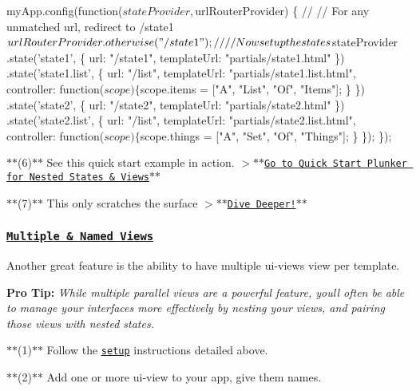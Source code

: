 \begin{quote}


\end{quote}

\begin{DoxyCode}
myApp.config(function($stateProvider, $urlRouterProvider) \{
  //
  // For any unmatched url, redirect to /state1
  $urlRouterProvider.otherwise("/state1");
  //
  // Now set up the states
  $stateProvider
    .state('state1', \{
      url: "/state1",
      templateUrl: "partials/state1.html"
    \})
    .state('state1.list', \{
      url: "/list",
      templateUrl: "partials/state1.list.html",
      controller: function($scope) \{
        $scope.items = ["A", "List", "Of", "Items"];
      \}
    \})
    .state('state2', \{
      url: "/state2",
      templateUrl: "partials/state2.html"
    \})
    .state('state2.list', \{
      url: "/list",
      templateUrl: "partials/state2.list.html",
      controller: function($scope) \{
        $scope.things = ["A", "Set", "Of", "Things"];
      \}
    \});
\});
\end{DoxyCode}


$\ast$$\ast$(6)$\ast$$\ast$ See this quick start example in action. $>$$\ast$$\ast$\href{http://plnkr.co/edit/u18KQc?p=preview}{\tt Go to Quick Start Plunker for Nested States \& Views}$\ast$$\ast$

$\ast$$\ast$(7)$\ast$$\ast$ This only scratches the surface $>$$\ast$$\ast$\href{https://github.com/angular-ui/ui-router/wiki}{\tt Dive Deeper!}$\ast$$\ast$

\subsubsection*{\href{http://plnkr.co/edit/SDOcGS?p=preview}{\tt Multiple \& Named Views}}

Another great feature is the ability to have multiple {\ttfamily ui-\/view}s view per template.

{\bfseries Pro Tip\+:} {\itshape While multiple parallel views are a powerful feature, you\textquotesingle{}ll often be able to manage your interfaces more effectively by nesting your views, and pairing those views with nested states.}

$\ast$$\ast$(1)$\ast$$\ast$ Follow the \href{#get-started}{\tt setup} instructions detailed above.

$\ast$$\ast$(2)$\ast$$\ast$ Add one or more {\ttfamily ui-\/view} to your app, give them names. \begin{quote}


\end{quote}

